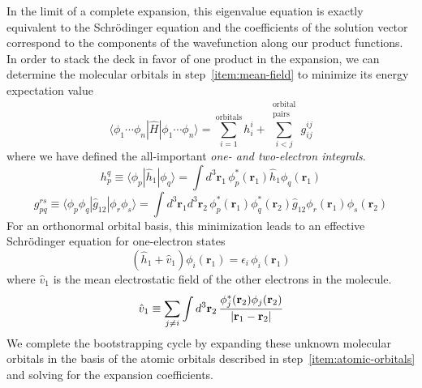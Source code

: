 In the limit of a complete expansion, this eigenvalue equation is exactly
equivalent to the Schr\"odinger equation and the coefficients of the solution
vector correspond to the components of the wavefunction along our product
functions.
In order to stack the deck in favor of one product in the expansion, we can
determine the molecular orbitals in step~\ref{item:mean-field} to minimize its
energy expectation value
\begin{equation}
    \label{eq:introduction:orbital-product-expectation-value}
    \langle \phi_1\cdots \phi_n|
    \hat{H}
    |\phi_1\cdots \phi_n \rangle
    =
    \sum_{i=1}^\mathrm{orbitals}
    h_i^i
    +
    \sum_{i<j}^{\substack{\mathrm{orbital}\\\mathrm{pairs}}}
    g_{ij}^{ij}
\end{equation}
where we have defined the all-important {\itshape one- and two-electron
integrals}.
\begin{equation}
    h_p^q
    \equiv
    \langle\phi_p|\hat{h}_1|\phi_q\rangle
    =
    \int
    d^3\mathbf{r}_1\,
    \phi_p^*(\mathbf{r}_1)
    \hat{h}_1
    \phi_q(\mathbf{r}_1)
\end{equation}
\begin{equation}
    g_{pq}^{rs}
    \equiv
    \langle\phi_p\phi_q|\hat{g}_{12}|\phi_r\phi_s\rangle
    =
    \int
    d^3\mathbf{r}_1
    d^3\mathbf{r}_2\,
    \phi_p^*(\mathbf{r}_1)
    \phi_q^*(\mathbf{r}_2)
    \hat{g}_{12}
    \phi_r(\mathbf{r}_1)
    \phi_s(\mathbf{r}_2)
\end{equation}
For an orthonormal orbital basis, this minimization leads to an effective
Schr\"odinger equation for one-electron states
\begin{equation}
    \label{eq:introduction:mean-field-orbitals}
    (
        \hat{h}_1
        +
        \hat{v}_1
    )
    \phi_i(\mathbf{r}_1)
    =
    \epsilon_i\,
    \phi_i(\mathbf{r}_1)
\end{equation}
where \(\hat{v}_1\) is the mean electrostatic field of the other electrons in
the molecule.
\begin{equation}
    \hat{v}_1
    \equiv
    \sum_{j\neq i}
    \int
    d^3\mathbf{r}_2\,
    \frac{%
        \phi_j^*(\mathbf{r}_2)\phi_j(\mathbf{r}_2)
    }{%
        |\mathbf{r}_1 - \mathbf{r}_2|
    }
\end{equation}
We complete the bootstrapping cycle by expanding these unknown molecular
orbitals in the basis of the atomic orbitals described in
step~\ref{item:atomic-orbitals} and solving for the expansion coefficients.

